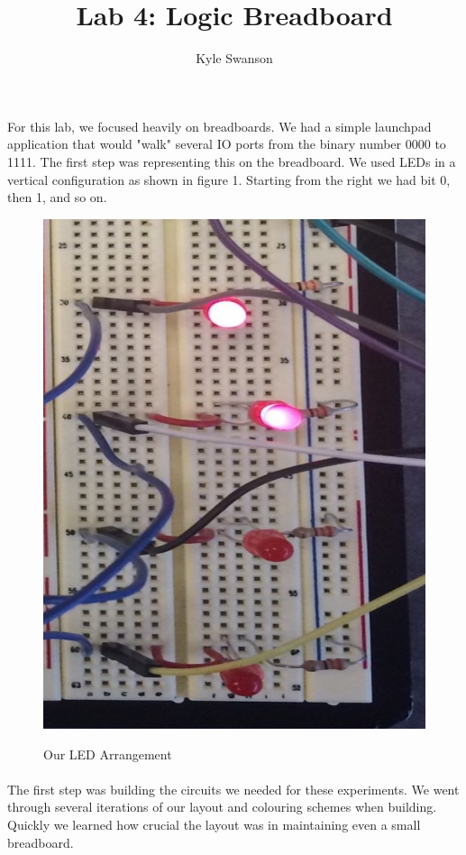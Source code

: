 \documentclass[12pt,a4paper]{report}
\author{Kyle Swanson}
\title{Lab 4: Logic Breadboard}
\begin{document}
\maketitle

\paragraph{}
For this lab, we focused heavily on breadboards. We had a simple launchpad application that would "walk" several IO ports from the binary number 0000 to 1111. The first step was representing this on the breadboard. We used LEDs in a vertical configuration as shown in figure 1. Starting from the right we had bit 0, then 1, and so on. \\
\begin{figure}
	\centering
	\includegraphics[scale=.1]{img/led_config} \\
	\caption{Our LED Arrangement}
\end{figure}

\paragraph{} 
The first step was building the circuits we needed for these experiments. We went through several iterations of our layout and colouring schemes when building. Quickly we learned how crucial the layout was in maintaining even a small breadboard. 
\end{document}

